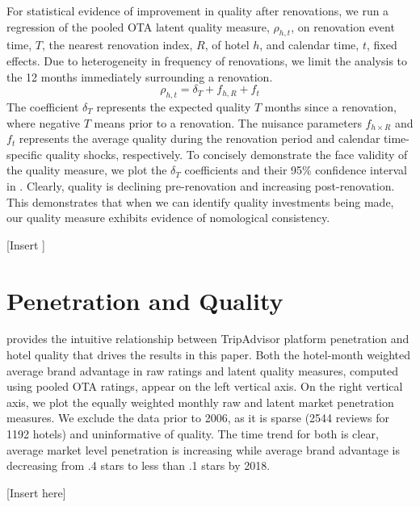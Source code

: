 \documentclass{informs_mod} %
\begin{document}
For statistical evidence of improvement in quality after renovations, we run a regression of the pooled OTA latent quality measure, $\rho_{h,t}$, on renovation event time, $T$, the nearest renovation index, $R$, of hotel $h$, and calendar time, $t$, fixed effects. Due to heterogeneity in frequency of renovations, we limit the analysis to the 12 months immediately surrounding a renovation.
\begin{equation}\label{eq:renoreg}
\rho_{h,t}=\delta_{T}+f_{h,R}+f_{t}
\end{equation}
The coefficient $\delta_T$ represents the expected quality $T$ months since a renovation, where negative $T$ means prior to a renovation. The nuisance parameters $f_{h\times R}$ and $f_t$ represents the average quality during the renovation period and calendar time-specific quality shocks, respectively. To concisely demonstrate the face validity of the quality measure, we plot the $\delta_T$ coefficients and their 95\% confidence interval in . Clearly, quality is declining pre-renovation and increasing post-renovation. This demonstrates that when we can identify quality investments being made, our quality measure exhibits evidence of nomological consistency. 

[Insert ]

\section{Penetration and Quality} \label{sec:mainstudy}

 provides the intuitive relationship between TripAdvisor platform penetration and hotel quality that drives the results in this paper. Both the hotel-month weighted average brand advantage in raw ratings and latent quality measures, computed using pooled OTA ratings, appear on the left vertical axis. On the right vertical axis, we plot the equally weighted monthly raw and latent market penetration measures. We exclude the data prior to 2006, as it is sparse (2544 reviews for 1192 hotels) and uninformative of quality. The time trend for both is clear, average market level penetration is increasing while average brand advantage is decreasing from .4 stars to less than .1 stars by 2018. 

[Insert  here]
\end{document}
